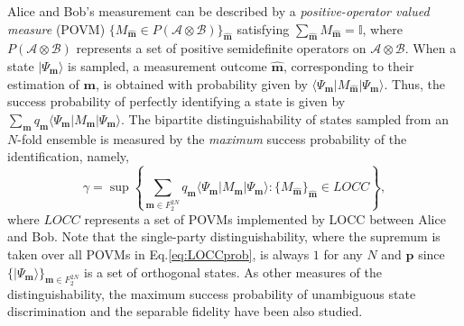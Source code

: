 \documentclass[aps,prx,twocolumn,showpacs,amsmath,notitlepage,amssymb,superscriptaddress]{revtex4-1}
\newcommand{\bra}[1]{\langle {#1} |}
\newcommand{\ket}[1]{| {#1} \rangle}
\begin{document}
Alice and Bob's measurement can be described by a {\it positive-operator valued measure} (POVM) $\{M_{\hat{\mathbf{m}}}\in P(\mathcal{A}\otimes\mathcal{B})\}_{\hat{\mathbf{m}}}$ satisfying $\sum_{\hat{\mathbf{m}}} M_{\hat{\mathbf{m}}}=\mathbb{I}$, where $P(\mathcal{A}\otimes\mathcal{B})$ represents a set of positive semidefinite operators on $\mathcal{A}\otimes\mathcal{B}$. When a state $\ket{\Psi_{\mathbf{m}}}$ is sampled, a measurement outcome $\hat{\mathbf{m}}$, corresponding to their estimation of $\mathbf{m}$, is obtained with probability given by $\bra{\Psi_{\mathbf{m}}}M_{\hat{\mathbf{m}}}\ket{\Psi_{\mathbf{m}}}$. Thus, the success probability of perfectly identifying a state is given by $\sum_{\mathbf{m}} q_{\mathbf{m}}\bra{\Psi_{\mathbf{m}}}M_{\mathbf{m}}\ket{\Psi_{\mathbf{m}}}$. The bipartite distinguishability of states sampled from an $N$-fold ensemble is measured by the {\it maximum} success probability of the identification, namely,
\begin{equation}
\label{eq:LOCCprob}
 \gamma=\sup\left\{\sum_{\mathbf{m}\in F_2^{2N}} q_{\mathbf{m}}\bra{\Psi_{\mathbf{m}}}M_{\mathbf{m}}\ket{\Psi_{\mathbf{m}}}:\{M_{\hat{\mathbf{m}}}\}_{\hat{\mathbf{m}}}\in  LOCC\right\},
\end{equation}
where $LOCC$ represents a set of POVMs implemented by LOCC between Alice and Bob. Note that the single-party distinguishability, where the supremum is taken over all POVMs in Eq.\eqref{eq:LOCCprob}, is always $1$ for any $N$ and $\mathbf{p}$ since $\{\ket{\Psi_{\mathbf{m}}}\}_{\mathbf{m}\in F_2^{2N}}$ is a set of orthogonal states.
As other measures of the distinguishability, the maximum success probability of unambiguous state discrimination \cite{unambiguous1, unambiguous2, unambiguous3} and the separable fidelity \cite{sepfid} have been also studied.
\end{document}
